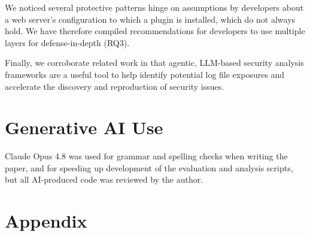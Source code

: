 \documentclass[sigconf]{acmart}
\begin{document}
We noticed several protective patterns hinge on assumptions by developers about a web server's configuration to which a plugin is installed, which do not always hold. We have therefore compiled recommendations for developers to use multiple layers for defense-in-depth (RQ3).

Finally, we corroborate related work in that agentic, LLM-based security analysis frameworks are a useful tool to help identify potential log file exposures and accelerate the discovery and reproduction of security issues. 


\section{Generative AI Use}
Claude Opus 4.8 was used for grammar and spelling checks when writing the paper, and for speeding up development of the evaluation and analysis scripts, but all AI-produced code was reviewed by the author.




\appendix
\section{Appendix}
\end{document}
